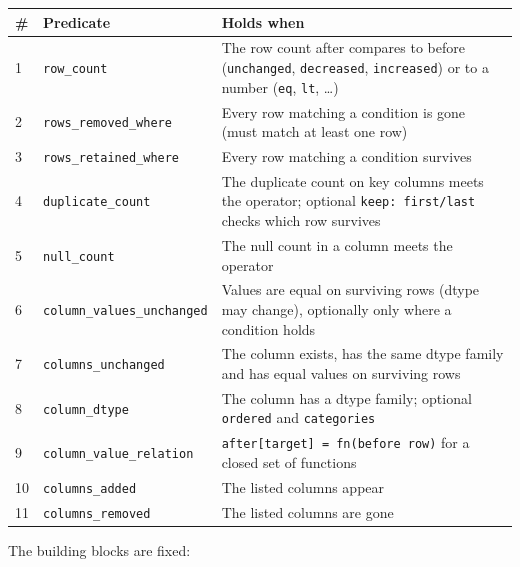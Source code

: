 \documentclass[11pt]{article}
\begin{document}
\begin{table}[!tp]
\centering\footnotesize\setlength{\tabcolsep}{3pt}\renewcommand{\arraystretch}{1.1}
\begin{tabularx}{\textwidth}{ll>{\raggedright\arraybackslash}X}
\toprule
\textbf{\#} & \textbf{Predicate} & \textbf{Holds when} \\
\midrule
1 & \texttt{row\_\allowbreak{}count} & The row count after compares to before (\texttt{unchanged}, \texttt{decreased}, \texttt{increased}) or to a number (\texttt{eq}, \texttt{lt}, …) \\
2 & \texttt{rows\_\allowbreak{}removed\_\allowbreak{}where} & Every row matching a condition is gone (must match at least one row) \\
3 & \texttt{rows\_\allowbreak{}retained\_\allowbreak{}where} & Every row matching a condition survives \\
4 & \texttt{duplicate\_\allowbreak{}count} & The duplicate count on key columns meets the operator; optional \texttt{keep: first/\allowbreak{}last} checks which row survives \\
5 & \texttt{null\_\allowbreak{}count} & The null count in a column meets the operator \\
6 & \texttt{column\_\allowbreak{}values\_\allowbreak{}unchanged} & Values are equal on surviving rows (dtype may change), optionally only where a condition holds \\
7 & \texttt{columns\_\allowbreak{}unchanged} & The column exists, has the same dtype family and has equal values on surviving rows \\
8 & \texttt{column\_\allowbreak{}dtype} & The column has a dtype family; optional \texttt{ordered} and \texttt{categories} \\
9 & \texttt{column\_\allowbreak{}value\_\allowbreak{}relation} & \texttt{after[target] = fn(before row)} for a closed set of functions \\
10 & \texttt{columns\_\allowbreak{}added} & The listed columns appear \\
11 & \texttt{columns\_\allowbreak{}removed} & The listed columns are gone \\
\bottomrule
\end{tabularx}
\end{table}

The building blocks are fixed:
\end{document}
